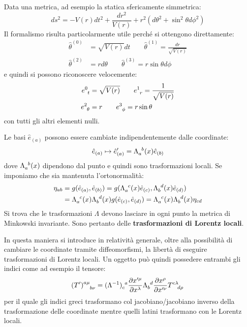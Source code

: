 \begin{esempio}
Data una metrica, ad esempio la statica sfericamente simmetrica:
\begin{equation*}
    ds^2 = - V(r)dt^2 + \frac{dr^2}{V(r)} + r^2(d\theta^2 + \sin^2\theta d\phi^2)
\end{equation*}
Il formalismo risulta particolarmente utile perché si ottengono direttamente:
\begin{align*}
    \hat{\theta}^{(0)} &= \sqrt{V(r)} dt \qquad
    \hat{\theta}^{(1)} = \frac{dr}{\sqrt{V(r)}} \\
    \hat{\theta}^{(2)} &= rd\theta \qquad
    \hat{\theta}^{(3)} = r\sin\theta d\phi
\end{align*}
e quindi si possono riconoscere velocemente:
\begin{align*}
    \tensor{e}{^0_t} &= \sqrt{V(r)} \qquad
    \tensor{e}{^1_r} = \frac{1}{\sqrt{V(r)}} \\
    \tensor{e}{^2_\theta} &= r \qquad
    \tensor{e}{^3_\phi} = r\sin\theta
\end{align*}
con tutti gli altri elementi nulli.
\end{esempio}

Le basi $\hat{e}_{(a)}$ possono essere cambiate indipendentemente dalle coordinate:
\begin{equation*}
    \hat{e}_{(a)}\mapsto \hat{e}_{(a)}' = \tensor{\Lambda}{_a^b}(x)\hat{e}_{(b)}
\end{equation*}
dove $\tensor{\Lambda}{_a^b}(x)$ dipendono dal punto e quindi sono trasformazioni locali. Se imponiamo che sia mantenuta l'ortonormalità:
\begin{align*}
    \eta_{ab} &= g(\hat{e}_{(a)}, \hat{e}_{(b)}) = g(\tensor{\Lambda}{_a^c}(x)\hat{e}_{(c)}, \tensor{\Lambda}{_b^d}(x)\hat{e}_{(d)}) \\
    &= \tensor{\Lambda}{_a^c}(x) \tensor{\Lambda}{_b^d}(x) g(\hat{e}_{(c)}, \hat{e}_{(d)}) = \tensor{\Lambda}{_a^c}(x)\tensor{\Lambda}{_b^d}(x)\eta_{cd}
\end{align*}
Si trova che le trasformazioni $\Lambda$ devono lasciare in ogni punto la metrica di Minkowski invariante. Sono pertanto delle \textbf{trasformazioni di Lorentz locali}.

In questa maniera si introduce in relatività generale, oltre alla possibilità di cambiare le coordinate tramite diffeomorfismi, la libertà di eseguire trasformazioni di Lorentz locali. Un oggetto può quindi possedere entrambi gli indici come ad esempio il tensore:
\begin{equation*}
    \tensor{(T')}{^{a\mu}_{b\nu}} = \tensor{(\Lambda^{-1})}{_c^a}\frac{\partial x'^\mu}{\partial x^\lambda}\tensor{\Lambda}{_b^d}\frac{\partial x^\rho}{\partial x'^\nu}\tensor{T}{^{c\lambda}_{d\rho}}
\end{equation*}
per il quale gli indici greci trasformano col jacobiano/jacobiano inverso della trasformazione delle coordinate mentre quelli latini trasformano con le Lorentz locali.

